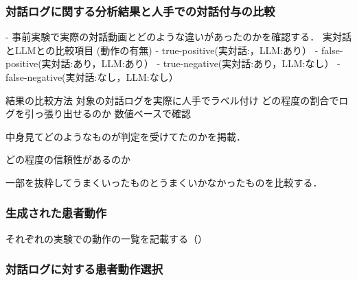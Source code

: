 \subsubsection*{対話ログに関する分析結果と人手での対話付与の比較}
- 事前実験で実際の対話動画とどのような違いがあったのかを確認する．
実対話とLLMとの比較項目  (動作の有無)
- true-positive(実対話:，LLM:あり）
- false-positive(実対話:あり，LLM:あり）
- true-negative(実対話:あり，LLM:なし）
- false-negative(実対話:なし，LLM:なし）

結果の比較方法
対象の対話ログを実際に人手でラベル付け
どの程度の割合でログを引っ張り出せるのか
数値ベースで確認

中身見てどのようなものが判定を受けてたのかを掲載．

どの程度の信頼性があるのか




一部を抜粋してうまくいったものとうまくいかなかったものを比較する．

\subsubsection*{生成された患者動作}
それぞれの実験での動作の一覧を記載する（）


\subsubsection*{対話ログに対する患者動作選択}

